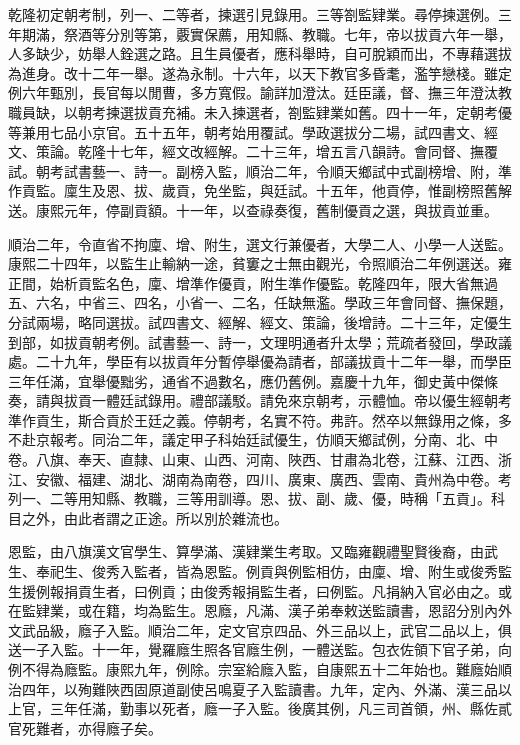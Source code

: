 \begin{pinyinscope}
乾隆初定朝考制，列一、二等者，揀選引見錄用。三等劄監肄業。尋停揀選例。三年期滿，祭酒等分別等第，覈實保薦，用知縣、教職。七年，帝以拔貢六年一舉，人多缺少，妨舉人銓選之路。且生員優者，應科舉時，自可脫穎而出，不專藉選拔為進身。改十二年一舉。遂為永制。十六年，以天下教官多昏耄，濫竽戀棧。雖定例六年甄別，長官每以閒曹，多方寬假。諭詳加澄汰。廷臣議，督、撫三年澄汰教職員缺，以朝考揀選拔貢充補。未入揀選者，劄監肄業如舊。四十一年，定朝考優等兼用七品小京官。五十五年，朝考始用覆試。學政選拔分二場，試四書文、經文、策論。乾隆十七年，經文改經解。二十三年，增五言八韻詩。會同督、撫覆試。朝考試書藝一、詩一。副榜入監，順治二年，令順天鄉試中式副榜增、附，準作貢監。廩生及恩、拔、歲貢，免坐監，與廷試。十五年，他貢停，惟副榜照舊解送。康熙元年，停副貢額。十一年，以查祿奏復，舊制優貢之選，與拔貢並重。

順治二年，令直省不拘廩、增、附生，選文行兼優者，大學二人、小學一人送監。康熙二十四年，以監生止輸納一途，貧窶之士無由觀光，令照順治二年例選送。雍正間，始析貢監名色，廩、增準作優貢，附生準作優監。乾隆四年，限大省無過五、六名，中省三、四名，小省一、二名，任缺無濫。學政三年會同督、撫保題，分試兩場，略同選拔。試四書文、經解、經文、策論，後增詩。二十三年，定優生到部，如拔貢朝考例。試書藝一、詩一，文理明通者升太學；荒疏者發回，學政議處。二十九年，學臣有以拔貢年分暫停舉優為請者，部議拔貢十二年一舉，而學臣三年任滿，宜舉優黜劣，通省不過數名，應仍舊例。嘉慶十九年，御史黃中傑條奏，請與拔貢一體廷試錄用。禮部議駁。請免來京朝考，示體恤。帝以優生經朝考準作貢生，斯合貢於王廷之義。停朝考，名實不符。弗許。然卒以無錄用之條，多不赴京報考。同治二年，議定甲子科始廷試優生，仿順天鄉試例，分南、北、中卷。八旗、奉天、直隸、山東、山西、河南、陜西、甘肅為北卷，江蘇、江西、浙江、安徽、福建、湖北、湖南為南卷，四川、廣東、廣西、雲南、貴州為中卷。考列一、二等用知縣、教職，三等用訓導。恩、拔、副、歲、優，時稱「五貢」。科目之外，由此者謂之正途。所以別於雜流也。

恩監，由八旗漢文官學生、算學滿、漢肄業生考取。又臨雍觀禮聖賢後裔，由武生、奉祀生、俊秀入監者，皆為恩監。例貢與例監相仿，由廩、增、附生或俊秀監生援例報捐貢生者，曰例貢；由俊秀報捐監生者，曰例監。凡捐納入官必由之。或在監肄業，或在籍，均為監生。恩廕，凡滿、漢子弟奉敕送監讀書，恩詔分別內外文武品級，廕子入監。順治二年，定文官京四品、外三品以上，武官二品以上，俱送一子入監。十一年，覺羅廕生照各官廕生例，一體送監。包衣佐領下官子弟，向例不得為廕監。康熙九年，例除。宗室給廕入監，自康熙五十二年始也。難廕始順治四年，以殉難陜西固原道副使呂鳴夏子入監讀書。九年，定內、外滿、漢三品以上官，三年任滿，勤事以死者，廕一子入監。後廣其例，凡三司首領，州、縣佐貳官死難者，亦得廕子矣。


\end{pinyinscope}
